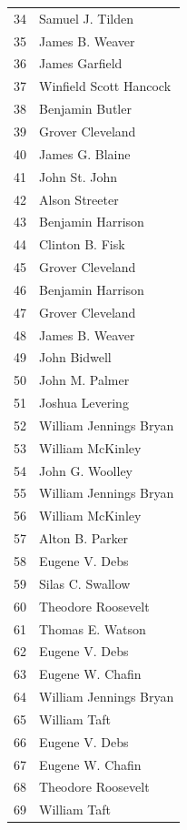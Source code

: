 \documentclass[
  letterpaper,
  DIV=11,
  numbers=noendperiod]{scrreprt}
\begin{document}
\begin{tabular}{ll}
34  &        Samuel J. Tilden \\
35  &         James B. Weaver \\
36  &          James Garfield \\
37  &  Winfield Scott Hancock \\
38  &         Benjamin Butler \\
39  &        Grover Cleveland \\
40  &         James G. Blaine \\
41  &           John St. John \\
42  &          Alson Streeter \\
43  &       Benjamin Harrison \\
44  &         Clinton B. Fisk \\
45  &        Grover Cleveland \\
46  &       Benjamin Harrison \\
47  &        Grover Cleveland \\
48  &         James B. Weaver \\
49  &            John Bidwell \\
50  &          John M. Palmer \\
51  &         Joshua Levering \\
52  &  William Jennings Bryan \\
53  &        William McKinley \\
54  &         John G. Woolley \\
55  &  William Jennings Bryan \\
56  &        William McKinley \\
57  &         Alton B. Parker \\
58  &          Eugene V. Debs \\
59  &        Silas C. Swallow \\
60  &      Theodore Roosevelt \\
61  &        Thomas E. Watson \\
62  &          Eugene V. Debs \\
63  &        Eugene W. Chafin \\
64  &  William Jennings Bryan \\
65  &            William Taft \\
66  &          Eugene V. Debs \\
67  &        Eugene W. Chafin \\
68  &      Theodore Roosevelt \\
69  &            William Taft \\

\end{tabular}
\end{document}
